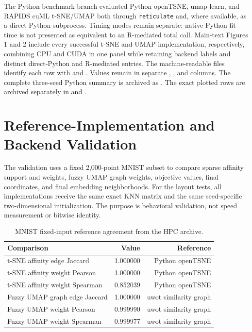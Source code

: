 \documentclass[twoside,11pt]{article}
\begin{document}
The Python benchmark branch evaluated Python openTSNE, umap-learn, and RAPIDS cuML t-SNE/UMAP both through \texttt{reticulate} and, where available, as a direct Python subprocess. Timing modes remain separate: native Python fit time is not presented as equivalent to an R-mediated total call. Main-text Figures 1 and 2 include every successful t-SNE and UMAP implementation, respectively, combining CPU and CUDA in one panel while retaining backend labels and distinct direct-Python and R-mediated entries. The machine-readable files identify each row with  and . Values remain in separate , , and  columns. The complete three-seed Python summary is archived as . The exact plotted rows are archived separately in  and .

\section{Reference-Implementation and Backend Validation}

The validation uses a fixed 2,000-point MNIST subset to compare sparse
affinity support and weights, fuzzy UMAP graph weights, objective values,
final coordinates, and final embedding neighborhoods. For the layout tests,
all implementations receive the same exact KNN matrix and the same
seed-specific two-dimensional initialization. The purpose is behavioral
validation, not speed measurement or bitwise identity.

\begin{table}[ht]
\centering
\caption{MNIST fixed-input reference agreement from the HPC archive.}
\label{tab:validation}
\small
\begin{tabular}{lrr}
\toprule
Comparison & Value & Reference\\
\midrule
t-SNE affinity edge Jaccard & 1.000000 & Python openTSNE\\
t-SNE affinity weight Pearson & 1.000000 & Python openTSNE\\
t-SNE affinity weight Spearman & 0.852039 & Python openTSNE\\
Fuzzy UMAP graph edge Jaccard & 1.000000 & uwot similarity graph\\
Fuzzy UMAP weight Pearson & 0.999990 & uwot similarity graph\\
Fuzzy UMAP weight Spearman & 0.999977 & uwot similarity graph\\
\bottomrule
\end{tabular}
\end{table}
\end{document}
